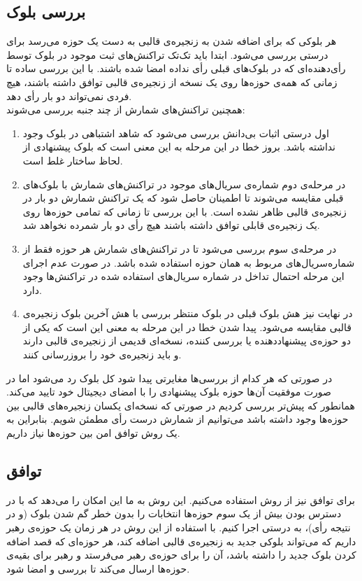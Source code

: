 \subsection{بررسی بلوک}
هر بلوکی که برای اضافه شدن به زنجیره‌ی قالبی به دست یک حوزه می‌رسد برای درستی بررسی می‌شود. ابتدا باید تک‌‌تک تراکنش‌های ثبت موجود در بلوک توسط رأی‌دهنده‌‌ای که در بلوک‌های قبلی رأی‌ نداده امضا شده باشند. با این بررسی ساده تا زمانی که همه‌ی حوزه‌ها روی یک نسخه از زنجیره‌ی قالبی توافق داشته باشند، هیچ فردی نمی‌تواند دو بار رأی ‌دهد.
\\
همچنین تراکنش‌های شمارش از چند جنبه بررسی می‌شوند:
	\begin{enumerate}
		\item 
		اول درستی اثبات‌ بی‌دانش بررسی می‌شود که شاهد اشتباهی در بلوک وجود نداشته باشد. بروز خطا در این مرحله به این معنی است که بلوک پیشنهادی از لحاظ ساختار غلط است.
		\item 
		در مرحله‌ی دوم شماره‌ی سریال‌های موجود در تراکنش‌های شمارش با بلوک‌های قبلی مقایسه می‌شوند تا اطمینان حاصل شود که یک تراکنش شمارش دو بار در زنجیره‌ی قالبی ظاهر نشده است. با این بررسی تا زمانی که تمامی حوزه‌ها روی یک زنجیره‌ی قابلی توافق داشته ‌باشند هیچ رأی دو بار شمرده نخواهد شد.
		\item 
		در مرحله‌ی سوم بررسی می‌شود تا در تراکنش‌های شمارش هر حوزه فقط از شماره‌سریال‌های مربوط به همان حوزه استفاده شده باشد. در صورت عدم اجرای این مرحله احتمال تداخل در شماره سریال‌های استفاده شده در تراکنش‌ها وجود دارد.
		\item 
		در نهایت نیز هش بلوک قبلی در بلوک منتظر بررسی با هش آخرین بلوک زنجیره‌ی قالبی مقایسه می‌شود. پیدا شدن خطا در این مرحله به معنی این است که یکی از دو حوزه‌ی پیشنهاددهنده یا بررسی کننده، نسخه‌ای قدیمی از زنجیره‌ی قالبی دارند و باید زنجیره‌ی خود را بروزرسانی کنند.
		
	\end{enumerate}

\par
 در صورتی که هر کدام از بررسی‌ها مغایرتی پیدا شود کل بلوک رد می‌شود اما در صورت موفقیت آن‌ها حوزه بلوک پیشنهادی را با امضای دیجیتال خود تایید می‌کند. همانطور که پیش‌تر بررسی کردیم در صورتی که نسخه‌ای یکسان زنجیره‌های قالبی بین حوزه‌ها وجود داشته باشد می‌توانیم از شمارش درست رأی مطمئن شویم. بنابراین به یک روش توافق امن بین حوزه‌ها نیاز داریم.


\subsection{توافق}
برای توافق نیز از روش  استفاده می‌کنیم. این روش به ما این امکان را می‌دهد که با در دسترس بودن بیش از یک سوم حوزه‌ها انتخابات را بدون خطر گم شدن بلوک (و در نتیجه رأی)، به درستی اجرا کنیم. با استفاده از این روش در هر زمان یک حوزه‌ی رهبر داریم که می‌تواند بلوکی جدید به زنجیره‌ی قالبی اضافه کند، هر حوزه‌ای که قصد اضافه کردن بلوک جدید را داشته باشد، آن را برای حوزه‌ی رهبر می‌فرستد و رهبر برای بقیه‌ی حوزه‌ها ارسال می‌کند تا بررسی و امضا شود. 


